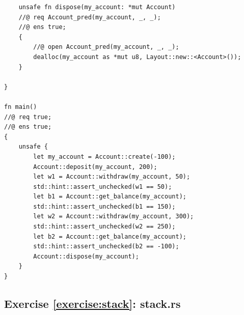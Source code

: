 \documentclass{article}
\begin{document}
\begin{lstlisting}
    unsafe fn dispose(my_account: *mut Account)
    //@ req Account_pred(my_account, _, _);
    //@ ens true;
    {
        //@ open Account_pred(my_account, _, _);
        dealloc(my_account as *mut u8, Layout::new::<Account>());
    }

}

fn main()
//@ req true;
//@ ens true;
{
    unsafe {
        let my_account = Account::create(-100);
        Account::deposit(my_account, 200);
        let w1 = Account::withdraw(my_account, 50);
        std::hint::assert_unchecked(w1 == 50);
        let b1 = Account::get_balance(my_account);
        std::hint::assert_unchecked(b1 == 150);
        let w2 = Account::withdraw(my_account, 300);
        std::hint::assert_unchecked(w2 == 250);
        let b2 = Account::get_balance(my_account);
        std::hint::assert_unchecked(b2 == -100);
        Account::dispose(my_account);
    }
}
\end{lstlisting}

\subsection{Exercise
\ref{exercise:stack}: stack.rs}\label{solution:stack}
\end{document}
